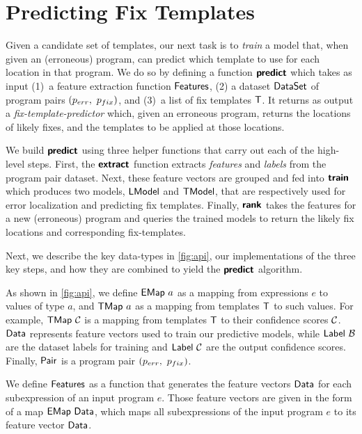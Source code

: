 \section{Predicting Fix Templates}
\label{sec:templ-pred}

Given a candidate set of templates, our next task is to \emph{train} a model
that, when given an (erroneous) program, can predict which template to use for
each location in that program.
%
We do so by defining a function $\bm{\mathsf{predict}}$ which takes as input
%
(1)~a feature extraction function $\mathsf{Features}$,
%
(2) a dataset $\mathsf{DataSet}$ of program pairs $(p_{err},\ p_{fix})$, and
%
(3)~a list of fix templates $\mathsf{T}$.
%
It returns as output a \emph{fix-template-predictor} which, given an
erroneous program, returns the locations of likely fixes, and the templates to
be applied at those locations.

We build $\bm{\mathsf{predict}}$ using three helper functions that carry out each of the
high-level steps.
%
First, the $\bm{\mathsf{extract}}$ function extracts \emph{features} and \emph{labels}
from the program pair dataset. Next, these feature vectors are grouped and fed
into $\bm{\mathsf{train}}$ which produces two models, $\mathsf{LModel}$ and $\mathsf{TModel}$, that are
respectively used for error localization and predicting fix templates.
%
Finally, $\bm{\mathsf{rank}}$ takes the features for a new (erroneous) program and
queries the trained models to return the likely fix locations and corresponding
fix-templates.

Next, we describe the key data-types in \autoref{fig:api}, our implementations
of the three key steps, and how they are combined to yield the $\bm{\mathsf{predict}}$
algorithm.

As shown in \autoref{fig:api}, we define $\mathsf{EMap}\ a$ as a mapping from
expressions $e$ to values of type $a$, and $\mathsf{TMap}\ a$ as a mapping from
templates $\mathsf{T}$ to such values. For example, $\mathsf{TMap}\ \mathcal{C}$ is a mapping from
templates $\mathsf{T}$ to their confidence scores $\mathcal{C}$. $\mathsf{Data}$ represents feature
vectors used to train our predictive models, while $\mathsf{Label}\ \mathcal{B}$ are the
dataset labels for training and $\mathsf{Label}\ \mathcal{C}$ are the output confidence
scores. Finally, $\mathsf{Pair}$ is a program pair $(p_{err},\ p_{fix})$.

We define $\mathsf{Features}$ as a function that generates the feature vectors
$\mathsf{Data}$ for each subexpression of an input program $e$. Those feature vectors
are given in the form of a map $\mathsf{EMap}\ \mathsf{Data}$, which maps all subexpressions
of the input program $e$ to its feature vector $\mathsf{Data}$.

